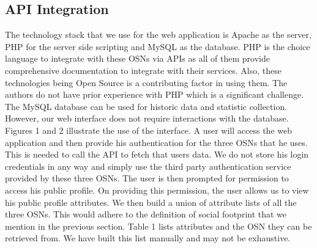 \documentclass[10pt,conference]{IEEEtran}
\begin{document}
\subsection{API Integration}
The technology stack that we use for the web application is Apache as the server, PHP for the server side scripting and MySQL as the database. PHP is the choice language to integrate with these OSNs via APIs as all of them provide comprehensive documentation to integrate with their services. Also, these technologies being Open Source is a contributing factor in using them. The authors do not have prior experience with PHP which is a significant challenge. The MySQL database can be used for historic data and statistic collection. However, our web interface does not require interactions with the database. Figures 1 and 2 illustrate the use of the interface. A user will access the web application and then provide his authentication for the three OSNs that he uses. This is needed to call the API to fetch that users data. We do not store his login credentials in any way and simply use the third party authentication service provided by these three OSNs. The user is then prompted for permission to access his public profile. On providing this permission, the user allows us to view his public profile attributes. We then build a union of attribute lists of all the three OSNs. This would adhere to the definition of social footprint that we mention in the previous section. Table 1 lists attributes and the OSN they can be retrieved from. We have built this list manually and may not be exhaustive.
\end{document}
